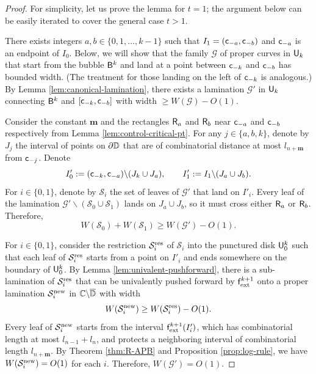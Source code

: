 \documentclass{amsart}
\begin{document}
\begin{proof}
    For simplicity, let us prove the lemma for $t=1$; the argument below can be easily iterated to cover the general case $t>1$. 
    
    There exists integers $a,b \in \{0,1,\ldots,k-1\}$ such that $I_1=(\mathsf{c}_{-a},\mathsf{c}_{-b})$ and $\mathsf{c}_{-a}$ is an endpoint of $I_0$. 
    Below, we will show that the family $\mathcal{G}$ of proper curves in $\mathsf{U}_k$ that start from the bubble $\mathsf{B}^k$ and land at a point between $\mathsf{c}_{-k}$ and $\mathsf{c}_{-b}$ has bounded width.
    (The treatment for those landing on the left of $\mathsf{c}_{-k}$ is analogous.)
    By Lemma \ref{lem:canonical-lamination}, there exists a lamination $\mathcal{G}'$ in $\mathsf{U}_k$ connecting $\mathsf{B}^k$ and $[\mathsf{c}_{-k},\mathsf{c}_{-b}]$ with width $\geq W(\mathcal{G}) - O(1)$.

    Consider the constant $\mathbf{m}$ and the rectangles $\mathsf{R}_a$ and $\mathsf{R}_b$ near $\mathsf{c}_{-a}$ and $\mathsf{c}_{-b}$ respectively from Lemma \ref{lem:control-critical-pt}. 
    For any $j \in \{a,b,k\}$, denote by $J_j$ the interval of points on $\partial \mathbb{D}$ that are of combinatorial distance at most $l_{n+\mathbf{m}}$ from $\mathsf{c}_{-j}$.
    Denote
    \[
        I'_0 := (\mathsf{c}_{-k}, \mathsf{c}_{-a}) \backslash (J_k \cup J_a), \qquad I'_1 := I_1 \backslash (J_a \cup J_b).
    \]
    For $i \in \{0,1\}$, denote by $\mathcal{S}_i$ the set of leaves of $\mathcal{G}'$ that land on $I'_i$. 
    Every leaf of the lamination $\mathcal{G}' \backslash (\mathcal{S}_0 \cup \mathcal{S}_1)$ lands on $J_a \cup J_b$, so it must cross either $\mathsf{R}_a$ or $\mathsf{R}_b$. 
    Therefore,
    \[
        W(\mathcal{S}_0) + W(\mathcal{S}_1) \geq W(\mathcal{G}') - O(1).
    \]

    For $i \in \{0,1\}$, consider the restriction $\mathcal{S}^{\textnormal{res}}_i$ of $\mathcal{S}_i$ into the punctured disk $\mathsf{U}_0^k$ such that each leaf of $\mathcal{S}^{\textnormal{res}}_i$ starts from a point on $I'_i$ and ends somewhere on the boundary of $\mathsf{U}_0^k$. 
    By Lemma \ref{lem:univalent-pushforward}, there is a sub-lamination of $\mathcal{S}^{\textnormal{res}}_i$ that can be univalently pushed forward by $\mathsf{f}_{\textnormal{ext}}^{k+1}$ onto a proper lamination $\mathcal{S}^{\textnormal{new}}_i$ in $\mathbb{C} \backslash \overline{\mathbb{D}}$ with width 
    \[
    W(\mathcal{S}^{\textnormal{new}}_i) \geq W(\mathcal{S}^{\textnormal{res}}_i) - O(1).
    \]
    Every leaf of $\mathcal{S}^{\textnormal{new}}_i$ starts from the interval $\mathsf{f}_{\textnormal{ext}}^{k+1}(I'_i)$, which has combinatorial length at most $l_{n-1}+l_n$, and protects a neighboring interval of combinatorial length $l_{n+\mathbf{m}}$. 
    By Theorem \ref{thm:R-APB} and Proposition \ref{prop:log-rule}, we have $W(\mathcal{S}^{\textnormal{new}}_i) = O(1)$ for each $i$. 
    Therefore, $W(\mathcal{G}') = O(1)$.
\end{proof}
\end{document}
